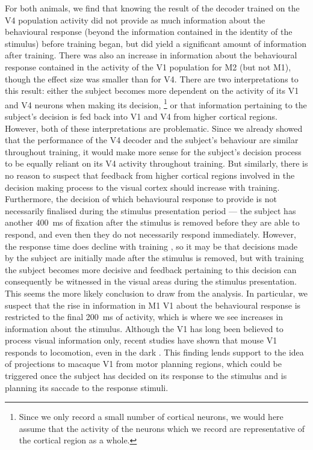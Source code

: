 For both animals, we find that knowing the result of the decoder trained on the \ac{V4} population activity did not provide as much information about the behavioural response (beyond the information contained in the identity of the stimulus) before training began, but did yield a significant amount of information after training.
There was also an increase in information about the behavioural response contained in the activity of the \ac{V1} population for \ac{M2} (but not \ac{M1}), though the effect size was smaller than for \ac{V4}.
There are two interpretations to this result: either the subject becomes more dependent on the activity of its \ac{V1} and \ac{V4} neurons when making its decision,%
\footnote{Since we only record a small number of cortical neurons, we would here assume that the activity of the neurons which we record are representative of the cortical region as a whole.}
or that information pertaining to the subject's decision is fed back into \ac{V1} and \ac{V4} from higher cortical regions.
However, both of these interpretations are problematic.
Since we already showed that the performance of the \ac{V4} decoder and the subject's behaviour are similar throughout training, it would make more sense for the subject's decision process to be equally reliant on its \ac{V4} activity throughout training.
But similarly, there is no reason to suspect that feedback from higher cortical regions involved in the decision making process to the visual cortex should increase with training.
Furthermore, the decision of which behavioural response to provide is not necessarily finalised during the stimulus presentation period --- the subject has another \SI{400}{\milli\second} of fixation after the stimulus is removed before they are able to respond, and even then they do not necessarily respond immediately.
However, the response time does decline with training \citep{Chen2013,Chen2013thesis}, so it may be that decisions made by the subject are initially made after the stimulus is removed, but with training the subject becomes more decisive and feedback pertaining to this decision can consequently be witnessed in the visual areas during the stimulus presentation.
This seems the more likely conclusion to draw from the analysis.
In particular, we suspect that the rise in information in \ac{M1} \ac{V1} about the behavioural response is restricted to the final \SI{200}{\milli\second} of activity, which is where we see increases in information about the stimulus.
Although the \acl{V1} has long been believed to process visual information only, recent studies have shown that mouse \ac{V1} responds to locomotion, even in the dark \citep{Pakan2016,Saleem2013,Keller2012}.
This finding lends support to the idea of projections to macaque \ac{V1} from motor planning regions, which could be triggered once the subject has decided on its response to the stimulus and is planning its saccade to the response stimuli.

